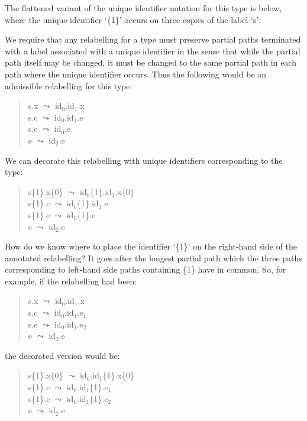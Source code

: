 The flattened variant of the unique identifier notation for this type
is below, where the unique identifier `\{1\}' occurs on three copies
of the label `s':
\begin{quote}
\end{quote}
We require that any relabelling for a type must preserve partial paths
terminated with a label associated with a unique identifier in the sense that
while the partial path itself may be changed, it must be changed to the same
partial path in each path where the unique identifier occurs.  Thus the
following would be an admissible relabelling for this type:
\begin{quote}
s.x $\leadsto$ id$_0$.id$_1$.x \\
s.c $\leadsto$ id$_0$.id$_1$.e \\
s.e $\leadsto$ id$_0$.e \\
e $\leadsto$ id$_2$.e
\end{quote}
We can decorate this relabelling with unique identifiers corresponding
to the type:
\begin{quote}
s\{1\}.x\{0\} $\leadsto$ id$_0$\{1\}.id$_1$.x\{0\} \\
s\{1\}.c $\leadsto$ id$_0$\{1\}.id$_1$.e \\
s\{1\}.e $\leadsto$ id$_0$\{1\}.e \\
e $\leadsto$ id$_2$.e
\end{quote}
How do we know where to place the identifier `\{1\}' on the right-hand
side of the annotated relabelling?  It goes after the longest partial
path which the three paths corresponding to left-hand side paths
containing \{1\} have in common.  So, for example, if the relabelling
had been:
\begin{quote}
s.x $\leadsto$ id$_0$.id$_1$.x \\
s.c $\leadsto$ id$_0$.id$_1$.e$_1$ \\
s.e $\leadsto$ id$_0$.id$_1$.e$_2$ \\
e $\leadsto$ id$_2$.e
\end{quote}
the decorated version would be:
\begin{quote}
s\{1\}.x\{0\} $\leadsto$ id$_0$.id$_1$\{1\}.x\{0\} \\
s\{1\}.c $\leadsto$ id$_0$.id$_1$\{1\}.e$_1$ \\
s\{1\}.e $\leadsto$ id$_0$.id$_1$\{1\}.e$_2$ \\
e $\leadsto$ id$_2$.e
\end{quote}

